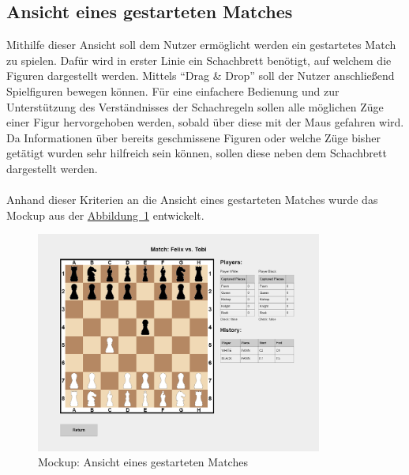 \subsection{Ansicht eines gestarteten Matches}\label{sec:gameView}
Mithilfe dieser Ansicht soll dem Nutzer ermöglicht werden ein gestartetes Match zu spielen. Dafür wird in erster Linie ein Schachbrett benötigt, auf welchem die Figuren dargestellt werden. Mittels \enquote{Drag \& Drop} soll der Nutzer anschließend Spielfiguren bewegen können. Für eine einfachere Bedienung und zur Unterstützung des Verständnisses der Schachregeln sollen alle möglichen Züge einer Figur hervorgehoben werden, sobald über diese mit der Maus gefahren wird. Da Informationen über bereits geschmissene Figuren oder welche Züge bisher getätigt wurden sehr hilfreich sein können, sollen diese neben dem Schachbrett dargestellt werden. \\
\\
Anhand dieser Kriterien an die Ansicht eines gestarteten Matches wurde das Mockup aus der \hyperref[fig:gameView]{Abbildung~\ref{fig:gameView}} entwickelt.\\
\begin{figure}[htb]
	\includegraphics[width=0.84\textwidth]{images/game-view.png}
	\caption{Mockup: Ansicht eines gestarteten Matches}
	\label{fig:gameView}
\end{figure}


